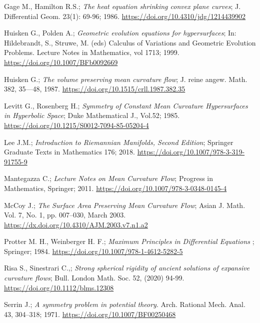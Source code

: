 \documentclass[a4paper, 12pt]{book}
\begin{document}
\begin{thebibliography}{21}
	 Gage M., Hamilton R.S.; {\em The heat equation shrinking convex plane curves}; J. Differential Geom. 23(1): 69-96; 1986. \href{https://doi.org/10.4310/jdg/1214439902}{https://doi.org/10.4310/jdg/1214439902}
	
	 Huisken G., Polden A.; {\em Geometric evolution equations for hypersurfaces};  In: Hildebrandt, S., Struwe, M. (eds) Calculus of Variations and Geometric Evolution Problems. Lecture Notes in Mathematics, vol 1713; 1999. \href{https://doi.org/10.1007/BFb0092669}{https://doi.org/10.1007/BFb0092669}
	
	 Huisken G.; {\em The volume preserving mean curvature flow}; J.  reine  angew.  Math.  382,  35—48, 1987. \href{https://doi.org/10.1515/crll.1987.382.35}{https://doi.org/10.1515/crll.1987.382.35}
	
	 Levitt G., Rosenberg H.;  {\em Symmetry of Constant Mean Curvature Hypersurfaces in Hyperbolic Space}; Duke Mathematical J., Vol.52; 1985. \href{https://doi.org/10.1215/S0012-7094-85-05204-4}{https://doi.org/10.1215/S0012-7094-85-05204-4}
	
	 Lee J.M.; {\em Introduction to Riemannian Manifolds, Second Edition};  Springer Graduate Texts in Mathematics 176; 2018. \href{https://doi.org/10.1007/978-3-319-91755-9}{https://doi.org/10.1007/978-3-319-91755-9}
	
	 Mantegazza C.; {\em Lecture Notes on Mean Curvature Flow}; Progress in Mathematics, Springer; 2011. \href{https://doi.org/10.1007/978-3-0348-0145-4}{https://doi.org/10.1007/978-3-0348-0145-4}
	
	 McCoy J.; {\em The Surface Area Preserving Mean Curvature Flow}; Asian J. Math. Vol. 7, No. 1, pp. 007–030, March 2003. \href{https://dx.doi.org/10.4310/AJM.2003.v7.n1.a2}{https://dx.doi.org/10.4310/AJM.2003.v7.n1.a2}
	
	  Protter M. H.,  Weinberger H. F.; {\em Maximum Principles in Differential Equations };  Springer; 1984. \href{https://doi.org/10.1007/978-1-4612-5282-5}{https://doi.org/10.1007/978-1-4612-5282-5}
	
	  Risa S., Sinestrari C.,; {\em Strong spherical rigidity of ancient solutions of expansive curvature flows};  Bull. London Math. Soc. 52, (2020) 94-99. \href{https://doi.org/10.1112/blms.12308}{https://doi.org/10.1112/blms.12308}
	
	 Serrin J.; {\em A symmetry problem in potential theory}. Arch. Rational Mech. Anal. 43, 304–318; 1971. \href{https://doi.org/10.1007/BF00250468}{https://doi.org/10.1007/BF00250468}
	

\end{thebibliography}
\end{document}

